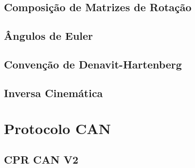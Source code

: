 \subsection{Composição de Matrizes de Rotação}


\subsection{Ângulos de Euler }

\subsection{Convenção de Denavit-Hartenberg}

\subsection{Inversa Cinemática}

\section{Protocolo CAN}
\subsection{CPR CAN V2}





